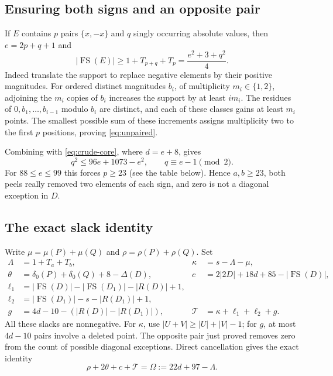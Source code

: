 \documentclass[11pt,a4paper]{article}
\newcommand{\FS}{\operatorname{FS}}
\newcommand{\T}{\mathcal T}
\begin{document}
\subsection{Ensuring both signs and an opposite pair}
If $E$ contains $p$ pairs $\{x,-x\}$ and $q$ singly occurring absolute
values, then $e=2p+q+1$ and
\begin{equation}\label{eq:unpaired}
 |\FS(E)|\ge1+T_{p+q}+T_p=\frac{e^2+3+q^2}{4}.
\end{equation}
Indeed translate the support to replace negative elements by their positive
magnitudes. For ordered distinct magnitudes $b_i$, of multiplicity
$m_i\in\{1,2\}$, adjoining the $m_i$ copies of $b_i$ increases the
support by at least $i m_i$. The residues of $0,b_1,\ldots,b_{i-1}$
modulo $b_i$ are distinct, and each of these classes gains at least $m_i$
points. The smallest possible sum of these increments assigns multiplicity
two to the first $p$ positions, proving \eqref{eq:unpaired}.

Combining with \eqref{eq:crude-core}, where $d=e+8$, gives
\[
 q^2\le96e+1073-e^2,\qquad q\equiv e-1\pmod2.
\]
For $88\le e\le99$ this forces $p\ge23$ (see the table below).
Hence $a,b\ge23$, both peels really removed two elements of each sign,
and zero is not a diagonal exception in $D$.

\subsection{The exact slack identity}
Write $\mu=\mu(P)+\mu(Q)$ and $\rho=\rho(P)+\rho(Q)$. Set
\begin{align*}
 \Lambda&=1+T_a+T_b,&\kappa&=s-\Lambda-\mu,\\
 \theta&=\delta_0(P)+\delta_0(Q)+8-\Delta(D),&
 c&=2|2D|+18d+85-|\FS(D)|,\\
 \ell_1&=|\FS(D)|-|\FS(D_1)|-|R(D)|+1,\\
 \ell_2&=|\FS(D_1)|-s-|R(D_1)|+1,\\
 g&=4d-10-(|R(D)|-|R(D_1)|),&
 \T&=\kappa+\ell_1+\ell_2+g.
\end{align*}
All these slacks are nonnegative. For $\kappa$, use
$|U+V|\ge|U|+|V|-1$; for $g$, at most $4d-10$ pairs involve a
deleted point. The opposite pair just proved removes zero from the count
of possible diagonal exceptions. Direct cancellation gives the exact identity
\begin{equation}\label{eq:budget}
 \boxed{\rho+2\theta+c+\T=\Omega:=22d+97-\Lambda.}
\end{equation}
\end{document}
